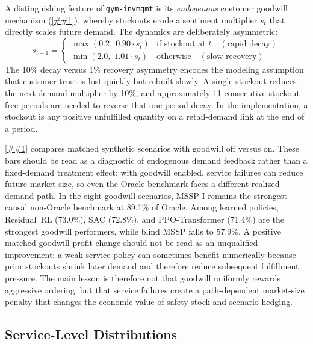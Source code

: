 \documentclass[10pt,a4paper]{article}
\providecommand{\Cref}[1]{\ref{##1}}
\begin{document}
A distinguishing feature of \texttt{gym-invmgmt} is its
\emph{endogenous} customer goodwill mechanism (\Cref{sec:framework}),
whereby stockouts erode a sentiment multiplier $s_t$ that directly
scales future demand. The dynamics are deliberately asymmetric:
\begin{equation}
  s_{t+1} = \begin{cases}
    \max(0.2, \; 0.90 \cdot s_t) & \text{if stockout at } t \quad (\text{rapid decay}) \\
    \min(2.0, \; 1.01 \cdot s_t) & \text{otherwise} \quad (\text{slow recovery})
  \end{cases}
\end{equation}
The 10\% decay versus 1\% recovery asymmetry encodes the modeling
assumption that customer trust is lost quickly but rebuilt slowly.
A single stockout reduces the next demand multiplier by 10\%, and
approximately 11 consecutive stockout-free periods are needed to
reverse that one-period decay. In the implementation, a stockout is any
positive unfulfilled quantity on a retail-demand link at the end of a
period.

\Cref{fig:goodwill_impact} compares matched synthetic scenarios with
goodwill off versus on. These bars should be read as a diagnostic of
endogenous demand feedback rather than a fixed-demand treatment effect:
with goodwill enabled, service failures can reduce future market size,
so even the Oracle benchmark faces a different realized demand path.
In the eight goodwill scenarios, MSSP-I remains the strongest causal
non-Oracle benchmark at 89.1\% of Oracle. Among learned policies,
Residual~RL (73.0\%), SAC (72.8\%), and PPO-Transformer (71.4\%)
are the strongest goodwill performers, while blind MSSP falls to
57.9\%. A positive matched-goodwill profit change should not be read
as an unqualified improvement: a weak service policy can sometimes
benefit numerically because prior stockouts shrink later demand and
therefore reduce subsequent fulfillment pressure. The main lesson is
therefore not that goodwill uniformly rewards aggressive ordering, but
that service failures create a path-dependent market-size penalty that
changes the economic value of safety stock and scenario hedging.

\subsection{Service-Level Distributions}
\end{document}
